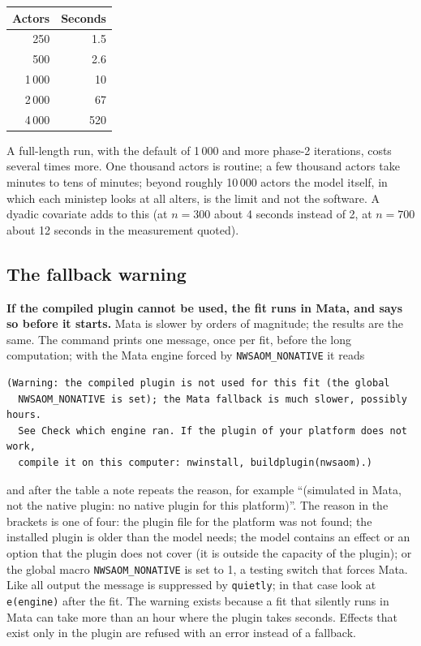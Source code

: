 \begin{center}
\small
\begin{tabular}{@{}rr@{}}
\toprule
Actors & Seconds \\
\midrule
250 & 1.5 \\
500 & 2.6 \\
1\,000 & 10 \\
2\,000 & 67 \\
4\,000 & 520 \\
\bottomrule
\end{tabular}
\end{center}
A full-length run, with the default  of 1\,000 and more phase-2 iterations, costs several times more. One thousand actors is routine; a few thousand actors take minutes to tens of minutes; beyond roughly 10\,000 actors the model itself, in which each ministep looks at all alters, is the limit and not the software. A dyadic covariate adds to this (at $n=300$ about 4 seconds instead of 2, at $n=700$ about 12 seconds in the measurement quoted).

\subsection{The fallback warning}\label{sec:fallbackwarn}

\textbf{If the compiled plugin cannot be used, the fit runs in Mata, and \nwsaom{} says so before it starts.} Mata is slower by orders of magnitude; the results are the same. The command prints one message, once per fit, before the long computation; with the Mata engine forced by \texttt{NWSAOM\_NONATIVE} it reads
\begin{lstlisting}
(Warning: the compiled plugin is not used for this fit (the global
  NWSAOM_NONATIVE is set); the Mata fallback is much slower, possibly hours.
  See Check which engine ran. If the plugin of your platform does not work,
  compile it on this computer: nwinstall, buildplugin(nwsaom).)
\end{lstlisting}
and after the table a note repeats the reason, for example ``(simulated in Mata, not the native plugin: no native plugin for this platform)''.
The reason in the brackets is one of four: the plugin file for the platform was not found; the installed plugin is older than the model needs; the model contains an effect or an option that the plugin does not cover (it is outside the capacity of the plugin); or the global macro \texttt{NWSAOM\_NONATIVE} is set to 1, a testing switch that forces Mata. Like all output the message is suppressed by \texttt{quietly}; in that case look at \texttt{e(engine)} after the fit. The warning exists because a fit that silently runs in Mata can take more than an hour where the plugin takes seconds. Effects that exist only in the plugin are refused with an error instead of a fallback.

